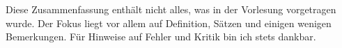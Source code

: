 \documentclass[12pt,a4paper]{article}
\theoremstyle{plain}
\theoremstyle{plain}
\theoremstyle{definition}
\theoremstyle{definition}
\theoremstyle{plain}
\begin{document}
	
	
	Diese Zusammenfassung enthält nicht alles, was in der Vorlesung vorgetragen wurde. Der Fokus liegt vor allem auf Definition, Sätzen und einigen wenigen Bemerkungen. Für Hinweise auf Fehler und Kritik bin ich stets dankbar.
	
	\tableofcontents
	
	
	
	
	
	
	
	
	
	
	
\end{document}
